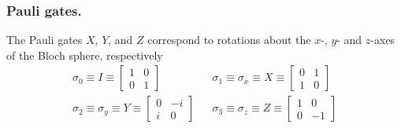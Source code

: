 \documentclass[../../../main.tex]{subfiles}
\begin{document}
\subsubsection{Pauli gates.}
The Pauli gates $X$, $Y $, and $Z$ correspond to rotations about the $x$-, $y$- and $z$-axes of the Bloch sphere, respectively
\begin{align*}
  \sigma_0 \equiv I \equiv \begin{bmatrix}
                             1 & 0 \\
                             0 & 1
                           \end{bmatrix}
   &  & \sigma_1 \equiv \sigma_x \equiv X \equiv \begin{bmatrix}
                                                   0 & 1 \\
                                                   1 & 0
                                                 \end{bmatrix} \\
  \sigma_2 \equiv \sigma_y \equiv Y \equiv \begin{bmatrix}
                                             0 & -i \\
                                             i & 0
                                           \end{bmatrix}
   &  & \sigma_3 \equiv \sigma_z \equiv Z \equiv \begin{bmatrix}
                                                   1 & 0  \\
                                                   0 & -1
                                                 \end{bmatrix}
\end{align*}
\end{document}
